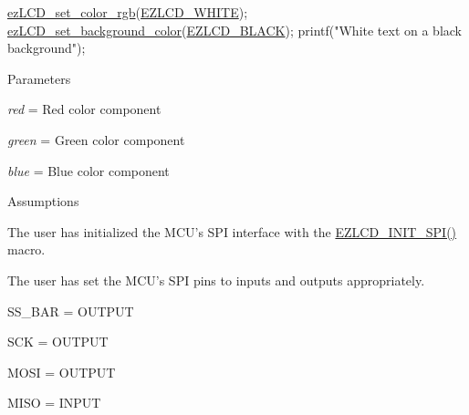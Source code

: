 \begin{DoxyCode}
\hyperlink{group__ez_l_c_d__103__colors_ga6b18ed4d0fb08b58b43a66a507a53dec}{ezLCD\_set\_color\_rgb}(\hyperlink{group__ez_l_c_d__103__colors_ga952952e02b45f2935aa9f59414804b0d}{EZLCD\_WHITE});
\hyperlink{group__ez_l_c_d__103__colors_gaad1ac28d20d1fea38fab9a0a46dcdaa1}{ezLCD\_set\_background\_color}(\hyperlink{group__ez_l_c_d__103__colors_ga8f5a452b20fe0b028fe4b9ebee7b6a8f}{EZLCD\_BLACK});
printf(\textcolor{stringliteral}{"White text on a black background"});
\end{DoxyCode}


 \begin{DoxyParagraph}{Parameters}

\begin{DoxyItemize}
\item {\itshape red} = Red color component
\item {\itshape green} = Green color component
\item {\itshape blue} = Blue color component
\end{DoxyItemize}
\end{DoxyParagraph}
\begin{DoxyParagraph}{Assumptions}

\begin{DoxyItemize}
\item The user has initialized the M\-C\-U's S\-P\-I interface with the \hyperlink{group__ez_l_c_d__103__common_gaf5c3b2dedc950d34e0381946fbb32428}{E\-Z\-L\-C\-D\-\_\-\-I\-N\-I\-T\-\_\-\-S\-P\-I()} macro.
\item The user has set the M\-C\-U's S\-P\-I pins to inputs and outputs appropriately. \par
\par

\begin{DoxyItemize}
\item S\-S\-\_\-\-B\-A\-R = O\-U\-T\-P\-U\-T
\item S\-C\-K = O\-U\-T\-P\-U\-T
\item M\-O\-S\-I = O\-U\-T\-P\-U\-T
\item M\-I\-S\-O = I\-N\-P\-U\-T 
\end{DoxyItemize}
\end{DoxyItemize}
\end{DoxyParagraph}
